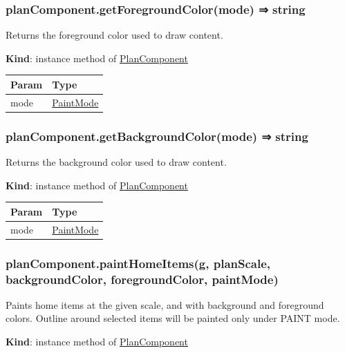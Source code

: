 \documentclass[a4paper]{report}
\begin{document}
\hypertarget{plancomponent.getforegroundcolormode-string}{%
\subsubsection{planComponent.getForegroundColor(mode) ⇒
string}\label{plancomponent.getforegroundcolormode-string}}

Returns the foreground color used to draw content.

\textbf{Kind}: instance method of
\protect\hyperlink{PlanComponent}{PlanComponent}

\begin{longtable}[]{@{}ll@{}}
\toprule
Param & Type\tabularnewline
\midrule
\endhead
mode &
\protect\hyperlink{PlanComponent.PaintMode}{PaintMode}\tabularnewline
\bottomrule
\end{longtable}

\hypertarget{plancomponent.getbackgroundcolormode-string}{%
\subsubsection{planComponent.getBackgroundColor(mode) ⇒
string}\label{plancomponent.getbackgroundcolormode-string}}

Returns the background color used to draw content.

\textbf{Kind}: instance method of
\protect\hyperlink{PlanComponent}{PlanComponent}

\begin{longtable}[]{@{}ll@{}}
\toprule
Param & Type\tabularnewline
\midrule
\endhead
mode &
\protect\hyperlink{PlanComponent.PaintMode}{PaintMode}\tabularnewline
\bottomrule
\end{longtable}

\hypertarget{plancomponent.painthomeitemsg-planscale-backgroundcolor-foregroundcolor-paintmode}{%
\subsubsection{planComponent.paintHomeItems(g, planScale,
backgroundColor, foregroundColor,
paintMode)}\label{plancomponent.painthomeitemsg-planscale-backgroundcolor-foregroundcolor-paintmode}}

Paints home items at the given scale, and with background and foreground
colors. Outline around selected items will be painted only under PAINT
mode.

\textbf{Kind}: instance method of
\protect\hyperlink{PlanComponent}{PlanComponent}
\end{document}
